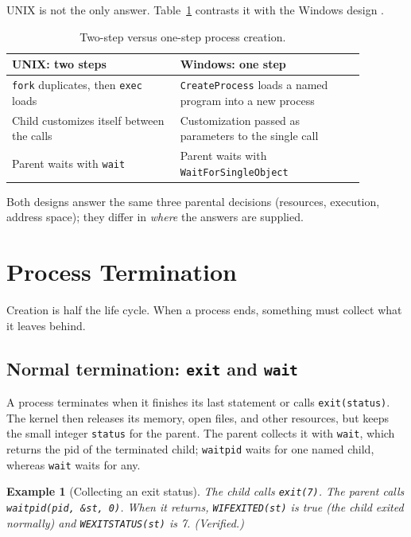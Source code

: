 \documentclass[11pt]{article}
\newtheorem{example}{Example}
\begin{document}
UNIX is not the only answer. Table~\ref{tab:unixwin} contrasts it with the
Windows design \cite{SilberschatzOSC_operating_system_concepts}.

\begin{table}[h]
\centering
\renewcommand{\arraystretch}{1.3}
\begin{tabular}{@{}p{0.42\linewidth}p{0.46\linewidth}@{}}
\toprule
\textbf{UNIX: two steps} & \textbf{Windows: one step} \\
\midrule
\texttt{fork} duplicates, then \texttt{exec} loads &
\texttt{CreateProcess} loads a named program into a new process \\
Child customizes itself between the calls &
Customization passed as parameters to the single call \\
Parent waits with \texttt{wait} &
Parent waits with \texttt{WaitForSingleObject} \\
\bottomrule
\end{tabular}
\caption{Two-step versus one-step process creation.}
\label{tab:unixwin}
\end{table}

\noindent Both designs answer the same three parental decisions (resources,
execution, address space); they differ in \emph{where} the answers are
supplied.

\section{Process Termination}

Creation is half the life cycle. When a process ends, something must collect
what it leaves behind.

\subsection{Normal termination: \texttt{exit} and \texttt{wait}}

A process terminates when it finishes its last statement or calls
\texttt{exit(status)}. The kernel then releases its memory, open files, and
other resources, but keeps the small integer \texttt{status} for the parent.
The parent collects it with \texttt{wait}, which returns the pid of the
terminated child; \texttt{waitpid} waits for one named child, whereas
\texttt{wait} waits for any.

\begin{example}[Collecting an exit status]
\label{ex:status}
The child calls \texttt{exit(7)}. The parent calls
\texttt{waitpid(pid, \&st, 0)}. When it returns, \texttt{WIFEXITED(st)} is true
(the child exited normally) and \texttt{WEXITSTATUS(st)} is 7. (Verified.)
\end{example}
\end{document}
